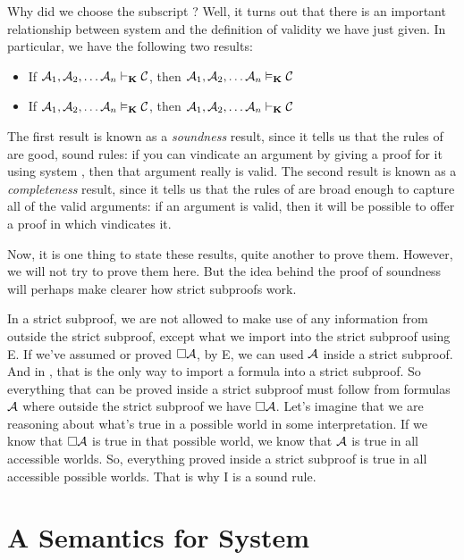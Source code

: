 Why did we choose the subscript \mlK? Well, it turns out that there is an important relationship between system \mlK{} and the definition of validity we have just given. In particular, we have the following two results:
\begin{itemize}
	\item If $\mathcal{A}_1,\mathcal{A}_2, \dots \mathcal{A}_n\vdash_{\mathbf{K}}\mathcal{C}$, then $\mathcal{A}_1,\mathcal{A}_2, \dots \mathcal{A}_n\vDash_{\mathbf{K}}\mathcal{C}$
	\item If $\mathcal{A}_1,\mathcal{A}_2, \dots \mathcal{A}_n\vDash_{\mathbf{K}}\mathcal{C}$, then $\mathcal{A}_1,\mathcal{A}_2, \dots \mathcal{A}_n\vdash_{\mathbf{K}}\mathcal{C}$
\end{itemize}
The first result is known as a \emph{soundness} result, since it tells us that the rules of \mlK{} are good, sound rules: if you can vindicate an argument by giving a proof for it using system \mlK, then that argument really is valid. The second result is known as a \emph{completeness} result, since it tells us that the rules of \mlK{} are broad enough to capture all of the valid arguments: if an argument is valid, then it will be possible to offer a proof in \mlK{} which vindicates it.

Now, it is one thing to state these results, quite another to prove them. However, we will not try to prove them here. But the idea behind the proof of soundness will perhaps make clearer how strict subproofs work. 

In a strict subproof, we are not allowed to make use of any information from outside the strict subproof, except what we import into the strict subproof using \ebox E. If we've assumed or proved $\Box \mathcal{A}$, by \ebox E, we can used $\mathcal{A}$ inside a strict subproof. And in \mlK, that is the only way to import a formula into a strict subproof. So everything that can be proved inside a strict subproof must follow from formulas $\mathcal{A}$ where outside the strict subproof we have $\Box \mathcal{A}$. Let's imagine that we are reasoning about what's true in a possible world in some interpretation. If we know that $\Box\mathcal{A}$ is true in that possible world, we know that $\mathcal{A}$ is true in all accessible worlds. So, everything proved inside a strict subproof is true in all accessible possible worlds. That is why \ebox I is a sound rule.

\section{A Semantics for System \mlT}
\label{SemanticsT}

